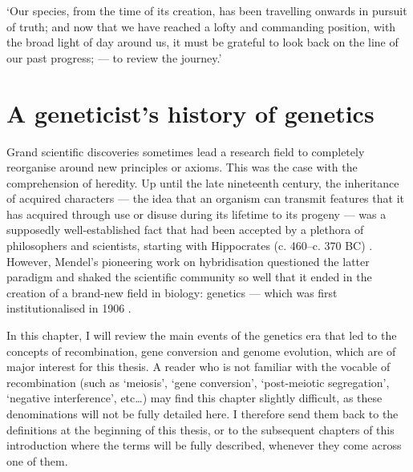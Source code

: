 \begin{savequote}[8cm]
‘Our species, from the time of its creation, has been travelling onwards in pursuit of truth; and now that we have reached a lofty and commanding position, with the broad light of day around us, it must be grateful to look back on the line of our past progress; — to review the journey.’
	
\end{savequote}

\chapter{\label{ch:1-history-genetics}A geneticist's history of genetics} 

\minitoc{}



Grand scientific discoveries sometimes lead a research field to completely reorganise around new principles or axioms. 
This was the case with the comprehension of heredity. 
Up until the late nineteenth century, the inheritance of acquired characters — the idea that an organism can transmit features that it has acquired through use or disuse during its lifetime to its progeny — was a supposedly well-established fact that had been accepted by a plethora of philosophers and scientists, starting with Hippocrates (c. 460--c. 370 BC) \citep{zirkle1935inheritance}.
However, Mendel's pioneering work on hybridisation questioned the latter paradigm and shaked the scientific community so well that it ended in the creation of a brand-new field in biology: genetics — which was first institutionalised in 1906 \citep{gayon2016mendel}.

In this chapter, I will review the main events of the genetics era that led to the concepts of recombination, gene conversion and genome evolution, which are of major interest for this thesis. %
A reader who is not familiar with the vocable of recombination (such as ‘meiosis’, ‘gene conversion’, ‘post-meiotic segregation’, ‘negative interference’, etc…) may find this chapter slightly difficult, as these denominations will not be fully detailed here. I therefore send them back to the definitions at the beginning of this thesis, or to the subsequent chapters of this introduction where the terms will be fully described, whenever they come across one of them.

